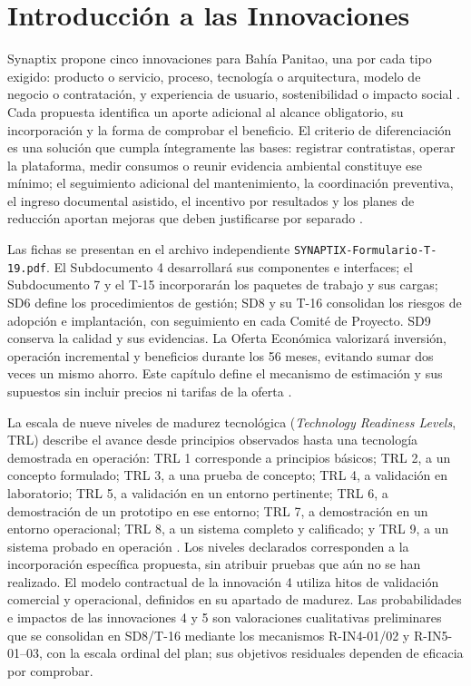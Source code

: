 \chapter{Introducción a las Innovaciones}

Synaptix propone cinco innovaciones para Bahía Panitao, una por cada tipo exigido: producto o servicio, proceso, tecnología o arquitectura, modelo de negocio o contratación, y experiencia de usuario, sostenibilidad o impacto social \parencite[art.~28, p.~19]{bases-admin}. Cada propuesta identifica un aporte adicional al alcance obligatorio, su incorporación y la forma de comprobar el beneficio. El criterio de diferenciación es una solución que cumpla íntegramente las bases: registrar contratistas, operar la plataforma, medir consumos o reunir evidencia ambiental constituye ese mínimo; el seguimiento adicional del mantenimiento, la coordinación preventiva, el ingreso documental asistido, el incentivo por resultados y los planes de reducción aportan mejoras que deben justificarse por separado \parencite[arts.~29--30, pp.~19--20]{bases-admin}.

Las fichas se presentan en el archivo independiente \texttt{SYNAPTIX-Formulario-T-19.pdf}. El Subdocumento 4 desarrollará sus componentes e interfaces; el Subdocumento 7 y el T-15 incorporarán los paquetes de trabajo y sus cargas; SD6 define los procedimientos de gestión; SD8 y su T-16 consolidan los riesgos de adopción e implantación, con seguimiento en cada Comité de Proyecto. SD9 conserva la calidad y sus evidencias. La Oferta Económica valorizará inversión, operación incremental y beneficios durante los 56 meses, evitando sumar dos veces un mismo ahorro. Este capítulo define el mecanismo de estimación y sus supuestos sin incluir precios ni tarifas de la oferta \parencite[art.~50.2, p.~30; Formulario~T-22, p.~68]{bases-admin}.

La escala de nueve niveles de madurez tecnológica (\textit{Technology Readiness Levels}, TRL) describe el avance desde principios observados hasta una tecnología demostrada en operación: TRL 1 corresponde a principios básicos; TRL 2, a un concepto formulado; TRL 3, a una prueba de concepto; TRL 4, a validación en laboratorio; TRL 5, a validación en un entorno pertinente; TRL 6, a demostración de un prototipo en ese entorno; TRL 7, a demostración en un entorno operacional; TRL 8, a un sistema completo y calificado; y TRL 9, a un sistema probado en operación \parencite{nasa-trl}. Los niveles declarados corresponden a la incorporación específica propuesta, sin atribuir pruebas que aún no se han realizado. El modelo contractual de la innovación 4 utiliza hitos de validación comercial y operacional, definidos en su apartado de madurez. Las probabilidades e impactos de las innovaciones 4 y 5 son valoraciones cualitativas preliminares que se consolidan en SD8/T-16 mediante los mecanismos R-IN4-01/02 y R-IN5-01--03, con la escala ordinal del plan; sus objetivos residuales dependen de eficacia por comprobar.

